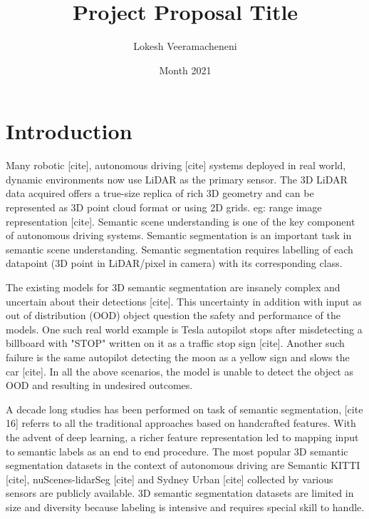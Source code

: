 \documentclass[thesis]{mas_proposal}
\title{Project Proposal Title}
\author{Lokesh Veeramacheneni}
\date{Month 2021}
\begin{document}
\maketitle

\pagestyle{plain}

\section{Introduction}
Many robotic [cite], autonomous driving [cite] systems deployed in real world, dynamic environments now use LiDAR as the primary sensor.
The 3D LiDAR data acquired offers a true-size replica of rich 3D geometry and can be represented as 3D point cloud format or using 2D grids. eg: range image representation [cite].
Semantic scene understanding is one of the key component of autonomous driving systems. 
Semantic segmentation is an important task in semantic scene understanding.
Semantic segmentation requires labelling of each datapoint (3D point in LiDAR/pixel in camera) with its corresponding class.

The existing models for 3D semantic segmentation are insanely complex and uncertain about their detections [cite]. 
This uncertainty in addition with input as out of distribution (OOD) object question the safety and performance of the models.
One such real world example is Tesla autopilot stops after misdetecting a billboard with "STOP" written on it as a traffic stop sign [cite]. 
Another such failure is the same autopilot detecting the moon as a yellow sign and slows the car [cite].
In all the above scenarios, the model is unable to detect the object as OOD and resulting in undesired outcomes.

A decade long studies has been performed on task of semantic segmentation, [cite 16] referrs to all the traditional approaches based on handcrafted features.
With the advent of deep learning, a richer feature representation led to mapping input to semantic labels as an end to end procedure.
The most popular 3D semantic segmentation datasets in the context of autonomous driving are Semantic KITTI [cite], nuScenes-lidarSeg [cite] and Sydney Urban [cite] collected by various sensors are publicly available.
3D semantic segmentation datasets are limited in size and diversity because labeling is intensive and requires special skill to handle.
\end{document}
